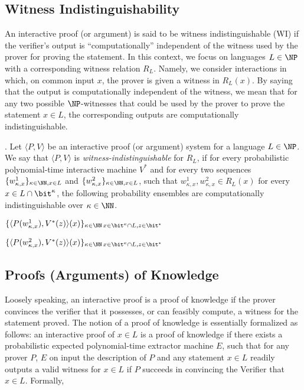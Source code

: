 \ED

\subsection{Witness Indistinguishability}
An interactive proof (or argument) is said to be witness indistinguishable (WI) if the verifier's
output is ``computationally'' independent of the witness used by the prover for proving the statement.
In this context, we focus on languages $L \in \NP$ with a corresponding witness relation $R_L$.
Namely, we consider interactions in which, on common input $x$, the prover is given a witness in
$R_L(x)$. By saying that the output is computationally independent of the witness, we mean that
for any two possible $\NP$-witnesses that could be used by the prover to prove the statement $x \in L$,
the corresponding outputs are computationally indistinguishable.

. Let $\langle P, V \rangle$ be an interactive proof (or argument) system for a language $L \in \NP$. We say that $\langle P, V \rangle$ is \emph{witness-indistinguishable} for $R_L$, if for every
probabilistic polynomial-time interactive machine $V^*$ and for every two sequences $\{w^1_{\kappa,x}\}_{\kappa\in \NN,x\in L}$ and $\{w^2_{\kappa,x}\}_{\kappa\in \NN,x\in L}$, such that $w^1_{\kappa,x}, w^2_{\kappa,x}\in R_L(x)$ for every $x \in L\cap \bit^\kappa$, the following probability
ensembles are computationally indistinguishable over $\kappa\in \NN$.
\ED

\BI
\item $\{\langle P(w^1_{\kappa,x}), V^*(z) \rangle(x)\}_{\kappa\in \NN\,x\in \bit^\kappa\cap L, z\in\bit^*}$
\item $\{\langle P(w^2_{\kappa,x}), V^*(z) \rangle(x)\}_{\kappa\in \NN\,x\in \bit^\kappa\cap L, z\in\bit^*}$
\EI
\subsection{Proofs (Arguments) of Knowledge}
Loosely speaking, an interactive proof is a proof of knowledge if the prover convinces the verifier
that it possesses, or can feasibly compute, a witness for the statement proved. The notion of a
proof of knowledge is essentially formalized as follows: an interactive proof of $x \in L$ is a proof of
knowledge if there exists a probabilistic expected polynomial-time extractor machine $E$, such that
for any prover $P$, $E$ on input the description of $P$ and any statement $x \in L$ readily outputs a valid
witness for $x \in L$ if $P$ succeeds in convincing the Verifier that $x \in L$. Formally,

